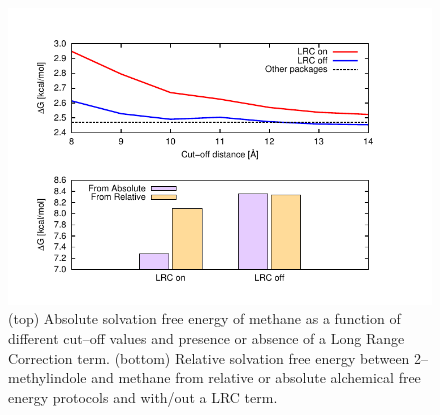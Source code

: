 \documentclass[journal=jctcce,manuscript=suppinfo]{achemso}
\begin{document}
\begin{figure}[ht]
\includegraphics[scale=1.0]{figures/LRC}
\caption{(top) Absolute solvation free energy of methane as a function of different cut--off values and presence or absence of a Long Range Correction term. (bottom) Relative solvation free energy between 2--methylindole and methane from relative or absolute alchemical free energy protocols and with/out a LRC term.}
\label{fig:LRC}
\end{figure}



\end{document}
